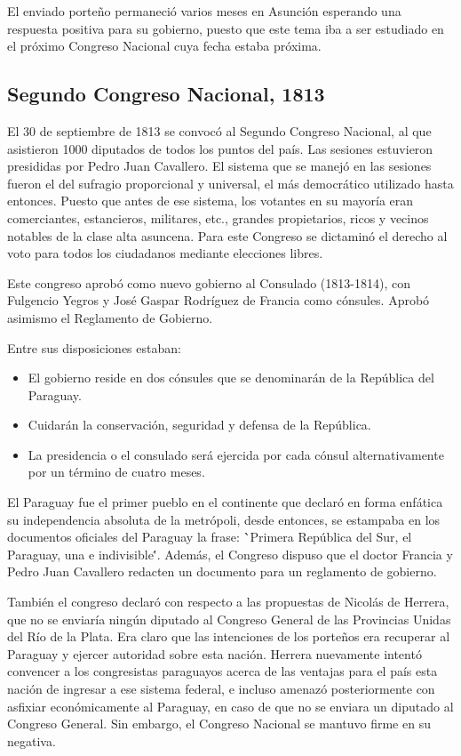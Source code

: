 \documentclass{article}
\begin{document}
El enviado porteño permaneció varios meses en Asunción esperando una respuesta 
positiva para su gobierno, puesto que este tema iba a ser estudiado en el 
próximo Congreso Nacional cuya fecha estaba próxima.

  \subsection*{Segundo Congreso Nacional, 1813}
  El 30 de septiembre de 1813 se convocó al Segundo Congreso Nacional, 
al que asistieron 1000 diputados de todos los puntos del país. Las sesiones 
estuvieron presididas por Pedro Juan Cavallero. El sistema que se manejó en
las sesiones fueron el del sufragio proporcional y universal, el más 
democrático utilizado hasta entonces. Puesto que antes de ese sistema,
los votantes en su mayoría eran comerciantes, estancieros, militares, etc.,
grandes propietarios, ricos y vecinos notables de la clase alta asuncena. Para
este Congreso se dictaminó el derecho al voto para todos los ciudadanos mediante 
elecciones libres.

Este congreso aprobó como nuevo gobierno al Consulado (1813-1814), con Fulgencio
Yegros y José Gaspar Rodríguez de Francia como cónsules. Aprobó asimismo
el Reglamento de Gobierno.

Entre sus disposiciones estaban:
  \begin{itemize}
    \item El gobierno reside en dos cónsules que se denominarán de la República del Paraguay.
    \item Cuidarán la conservación, seguridad y defensa de la República.
    \item La presidencia o el consulado será ejercida por cada cónsul alternativamente por un término de cuatro meses.
  \end{itemize}

El Paraguay fue el primer pueblo en el continente que declaró en forma enfática
su independencia absoluta de la metrópoli, desde entonces, se estampaba en los documentos
oficiales del Paraguay la frase: \``Primera República del Sur, el Paraguay, una e indivisible\''.
Además, el Congreso dispuso que el doctor Francia y Pedro Juan Cavallero redacten un documento 
para un reglamento de gobierno.

También el congreso declaró con respecto a las propuestas de Nicolás de Herrera, que no se 
enviaría ningún diputado al Congreso General de las Provincias Unidas del Río de la Plata. Era
claro que las intenciones de los porteños era recuperar al Paraguay y ejercer autoridad sobre
esta nación. Herrera nuevamente intentó convencer a los congresistas paraguayos acerca de 
las ventajas para el país esta nación de ingresar a ese sistema federal, e incluso
amenazó posteriormente con asfixiar económicamente al Paraguay, en caso de que no se enviara un
diputado al Congreso General. Sin embargo, el Congreso Nacional se mantuvo firme en su negativa.
\end{document}
